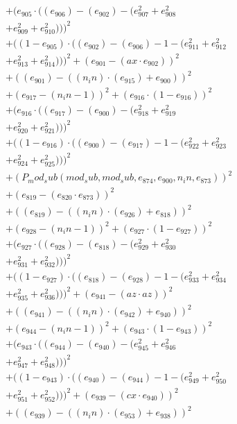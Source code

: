\documentclass[10pt, a4paper]{article}
\begin{document}
\begin{align*}
& + (e_{905}  \cdot  ((e_{906}) - (e_{902}) - (e_{907}^{2} + e_{908}^{2} \\
& + e_{909}^{2} + e_{910}^{2})))^{2} \\
& + ((1 - e_{905})  \cdot  ((e_{902}) - (e_{906}) - 1 - (e_{911}^{2} + e_{912}^{2} \\
& + e_{913}^{2} + e_{914}^{2})))^{2} + (e_{901} - (ax  \cdot  e_{902}))^{2} \\
& + ((e_{901}) - ((n_in)  \cdot  (e_{915}) + e_{900}))^{2} \\
& + (e_{917} - (n_in - 1))^{2} + (e_{916}  \cdot  (1 - e_{916}))^{2} \\
& + (e_{916}  \cdot  ((e_{917}) - (e_{900}) - (e_{918}^{2} + e_{919}^{2} \\
& + e_{920}^{2} + e_{921}^{2})))^{2} \\
& + ((1 - e_{916})  \cdot  ((e_{900}) - (e_{917}) - 1 - (e_{922}^{2} + e_{923}^{2} \\
& + e_{924}^{2} + e_{925}^{2})))^{2} \\
& + (P_mod_sub(mod_sub, mod_sub, e_{874}, e_{900}, n_in, e_{873}))^{2} \\
& + (e_{819} - (e_{820}  \cdot  e_{873}))^{2} \\
& + ((e_{819}) - ((n_in)  \cdot  (e_{926}) + e_{818}))^{2} \\
& + (e_{928} - (n_in - 1))^{2} + (e_{927}  \cdot  (1 - e_{927}))^{2} \\
& + (e_{927}  \cdot  ((e_{928}) - (e_{818}) - (e_{929}^{2} + e_{930}^{2} \\
& + e_{931}^{2} + e_{932}^{2})))^{2} \\
& + ((1 - e_{927})  \cdot  ((e_{818}) - (e_{928}) - 1 - (e_{933}^{2} + e_{934}^{2} \\
& + e_{935}^{2} + e_{936}^{2})))^{2} + (e_{941} - (az  \cdot  az))^{2} \\
& + ((e_{941}) - ((n_in)  \cdot  (e_{942}) + e_{940}))^{2} \\
& + (e_{944} - (n_in - 1))^{2} + (e_{943}  \cdot  (1 - e_{943}))^{2} \\
& + (e_{943}  \cdot  ((e_{944}) - (e_{940}) - (e_{945}^{2} + e_{946}^{2} \\
& + e_{947}^{2} + e_{948}^{2})))^{2} \\
& + ((1 - e_{943})  \cdot  ((e_{940}) - (e_{944}) - 1 - (e_{949}^{2} + e_{950}^{2} \\
& + e_{951}^{2} + e_{952}^{2})))^{2} + (e_{939} - (cx  \cdot  e_{940}))^{2} \\
& + ((e_{939}) - ((n_in)  \cdot  (e_{953}) + e_{938}))^{2} \\

\end{align*}
\end{document}
